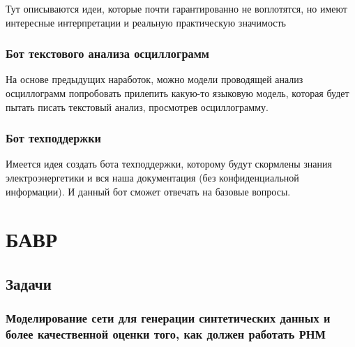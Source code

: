 Тут описываются идеи, которые почти гарантированно не воплотятся, но имеют интересные интерпретации и реальную практическую значимость\par\vspace{0.3cm}

\subsubsection*{Бот текстового анализа осциллограмм}

На основе предыдущих наработок, можно модели проводящей анализ осциллограмм попробовать прилепить какую-то языковую модель, которая будет пытать писать текстовый анализ, просмотрев осциллограмму.\par\vspace{0.3cm}

\subsubsection*{Бот техподдержки}

Имеется идея создать бота техподдержки, которому будут скормлены знания электроэнергетики и вся наша документация (без конфиденциальной информации). И данный бот сможет отвечать на базовые вопросы.\par\vspace{0.3cm}

\par\vspace{0.2cm}
\par\vspace{0.2cm}
\par\vspace{0.2cm}

\section*{БАВР}

\subsection*{Задачи}

\subsubsection*{Моделирование сети для генерации синтетических данных и более качественной оценки того, как должен работать РНМ}

